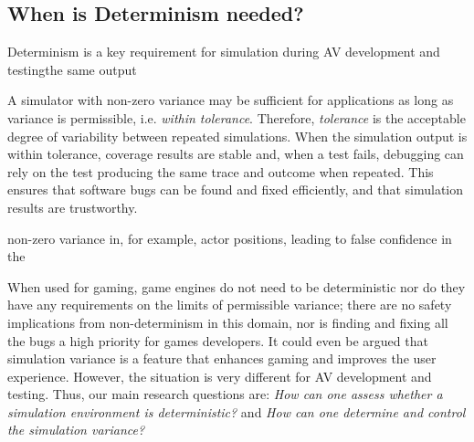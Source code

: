 \subsection{When is Determinism needed?}
\DIFaddbegin 

\DIFaddend Determinism is a key requirement for simulation during AV development and testing\DIFdelbegin {}\DIFdelend \DIFaddbegin {}\DIFaddend the same output \DIFdelbegin {}\textit{}%

\DIFdelend \DIFaddbegin {}\DIFaddend A simulator with non-zero variance \DIFdelbegin {}\DIFdelend \DIFaddbegin {}\DIFaddend may be sufficient for \DIFdelbegin {}\DIFdelend \DIFaddbegin {}\DIFaddend applications as long as \DIFdelbegin {}\DIFdelend variance is permissible, i.e. \DIFdelbegin \DIFdel{\ }\DIFdelend \textit{within tolerance}. Therefore, \textit{tolerance} is the acceptable degree of variability between repeated simulations. When the simulation output is within tolerance, coverage results are stable and, when a test fails, debugging can rely on the test producing the same trace and outcome when repeated. This ensures that software bugs can be found and fixed efficiently, and that simulation results are trustworthy.

\DIFdelbegin {}\DIFdelend \DIFaddbegin {}\DIFaddend non-zero variance in, for example, actor positions, \DIFdelbegin {}\DIFdelend \DIFaddbegin {}\DIFaddend leading to false confidence in the \DIFdelbegin {}%

\DIFdelend \DIFaddbegin {}\DIFaddend When used for gaming, game engines do not need to be deterministic nor do they have any requirements on the limits of permissible variance; there are no safety implications from non-determinism in this domain, nor is finding and fixing all the bugs a high priority for games developers. It could even be argued that simulation variance is a feature that enhances gaming and improves the user experience. However, the situation is very different for AV development and testing. Thus, our main research questions are:
{\em How can one assess whether a simulation environment is deterministic?} and 
{\em How can one determine and control the simulation variance?}


